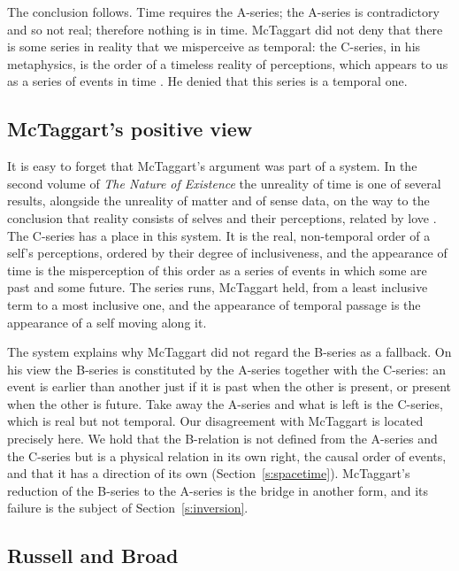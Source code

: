 \documentclass{situationist-preprint}
\begin{document}
The conclusion follows. Time requires the A-series; the A-series is contradictory and so not real; therefore nothing is in time. McTaggart did not deny that there is some series in reality that we misperceive as temporal: the C-series, in his metaphysics, is the order of a timeless reality of perceptions, which appears to us as a series of events in time \citep{McTaggart1927}. He denied that this series is a temporal one.

\subsection{McTaggart's positive view}

It is easy to forget that McTaggart's argument was part of a system. In the second volume of \emph{The Nature of Existence} the unreality of time is one of several results, alongside the unreality of matter and of sense data, on the way to the conclusion that reality consists of selves and their perceptions, related by love \citep{McTaggart1927}. The C-series has a place in this system. It is the real, non-temporal order of a self's perceptions, ordered by their degree of inclusiveness, and the appearance of time is the misperception of this order as a series of events in which some are past and some future. The series runs, McTaggart held, from a least inclusive term to a most inclusive one, and the appearance of temporal passage is the appearance of a self moving along it.

The system explains why McTaggart did not regard the B-series as a fallback. On his view the B-series is constituted by the A-series together with the C-series: an event is earlier than another just if it is past when the other is present, or present when the other is future. Take away the A-series and what is left is the C-series, which is real but not temporal. Our disagreement with McTaggart is located precisely here. We hold that the B-relation is not defined from the A-series and the C-series but is a physical relation in its own right, the causal order of events, and that it has a direction of its own (Section~\ref{s:spacetime}). McTaggart's reduction of the B-series to the A-series is the bridge in another form, and its failure is the subject of Section~\ref{s:inversion}.

\subsection{Russell and Broad}
\end{document}
